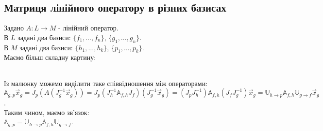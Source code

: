 \documentclass[a4paper, 10pt]{article}
\theoremstyle{theoremdd}
\newtheorem{remark}[theorem]{Remark}
\begin{document}
\iffalse
\begin{remark}
Знаходження матриці дужа схожа з випадком із пункту 2.7. Якщо тут встановити одиничний оператор $A: L_f \to L_g$, в якому для першого старий базис, а в другому відповідно новий, то отримаємо наш поточний випадок.
\end{remark}
\fi

\subsection{Матриця лінійного оператору в різних базисах}
Задано $A \colon L \to M$ - лінійний оператор.\\
В $L$ задані два базиси: $\{f_1,\dots, f_n\}$, $\{g_1, \dots, g_n\}$.\\
В $M$ задані два базиси: $\{h_1,\dots, h_k\}$, $\{p_1, \dots, p_k\}$.\\
Маємо більш складну картину:\\
\\
Із малюнку можемо виділити таке співвідношення між операторами:\\
$\mathbb{A}_{g,p} \vec{x}_g = J_p(A(J_g^{-1} \vec{x}_g)) = J_p(J_h^{-1} \mathbb{A}_{f,h} J_f)(J_g^{-1} \vec{x}_g) = (J_p J_h^{-1}) \mathbb{A}_{f,h} (J_f J_g^{-1})\vec{x}_g = \mathbb{U}_{h \to p} \mathbb{A}_{f,h} \mathbb{U}_{g \to f} \vec{x}_g$.\\
Таким чином, маємо зв'язок:\\
$\mathbb{A}_{g,p} = \mathbb{U}_{h \to p} \mathbb{A}_{f,h} \mathbb{U}_{g \to f}$.
\end{document}
